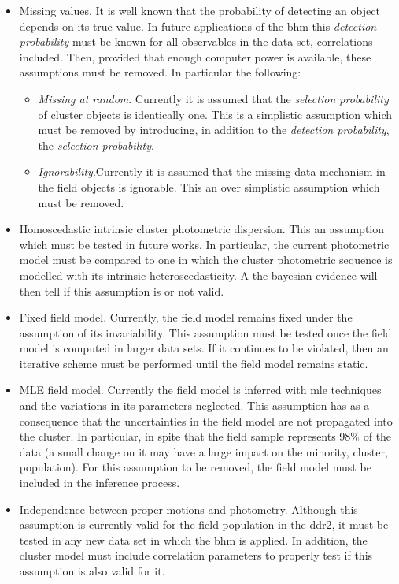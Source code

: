 \begin{itemize}
\item Missing values. It is well known that the probability of detecting an object depends on its true value. In future applications of the \gls{bhm} this \emph{detection probability} must be known for all observables in the data set, correlations included. Then, provided that enough computer power is available, these assumptions must be removed. In particular the following:
\begin{itemize}
\item \emph{Missing at random}. Currently it is assumed that the \emph{selection probability} of cluster objects is identically one. This is a simplistic assumption which must be removed by introducing, in addition to the  \emph{detection probability}, the \emph{selection probability}.
\item \emph{Ignorability}.Currently it is assumed that the missing data mechanism in the field objects is ignorable. This an over simplistic assumption which must be removed.
\end{itemize}
\item Homoscedastic intrinsic cluster photometric dispersion. This an assumption which must be tested in future works. In particular, the current photometric model must be compared to one in which the cluster photometric sequence is modelled with its intrinsic heteroscedasticity. A the bayesian evidence will then tell if this assumption is or not valid.

\item Fixed field model. Currently, the field model remains fixed under the assumption of its invariability. This assumption must be tested once the field model is computed in larger data sets. If it continues to be violated, then an iterative scheme must be performed until the field model remains static. 

\item MLE field model. Currently the field model is inferred with \gls{mle} techniques and the variations in its parameters neglected. This assumption has as a consequence that the uncertainties in the field model are not propagated into the cluster. In particular, in spite that the field sample represents 98\% of the data (a small change on it may have a large impact on the minority, cluster, population). For this assumption to be removed, the field model must be included in the inference process.

\item Independence between proper motions and photometry. Although this assumption is currently valid for the field population in the  \gls{ddr2}, it must be tested in any new data set in which the \gls{bhm} is applied. In addition, the cluster model must include correlation parameters to properly test if this assumption is also valid for it.


\end{itemize}
